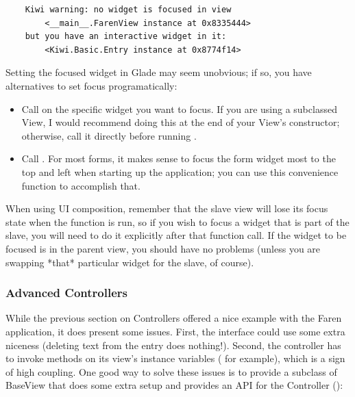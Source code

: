 \documentclass[a4paper]{howto}
\begin{document}
    \begin{verbatim}
    Kiwi warning: no widget is focused in view
        <__main__.FarenView instance at 0x8335444>
    but you have an interactive widget in it:
        <Kiwi.Basic.Entry instance at 0x8774f14>
    \end{verbatim}

Setting the focused widget in Glade may seem unobvious; if so, you have
alternatives to set focus programatically:

\begin{itemize}
\item Call  on the specific widget you want to focus.
If you are using a subclassed View, I would recommend doing this at the
end of your View's constructor; otherwise, call it directly before
running .
\item Call . For most forms, it makes sense
to focus the form widget most to the top and left when starting up the
application; you can use this convenience function to accomplish that.
\end{itemize}

When using UI composition, remember that the slave view will lose its
focus state when the function  is run, so if you
wish to focus a widget that is part of the slave, you will need to do it
explicitly after that function call. If the widget to be focused is in
the parent view, you should have no problems (unless you are swapping
*that* particular widget for the slave, of course).

\subsubsection{Advanced Controllers}

While the previous section on Controllers offered a nice example with
the Faren application, it does present some issues. First, the interface
could use some extra niceness (deleting text from the entry does
nothing!). Second, the controller has to invoke methods on its view's
instance variables ( for example),
which is a sign of high coupling. One good way to solve these issues is
to provide a subclass of BaseView that does some extra setup and
provides an API for the Controller ():
\end{document}
